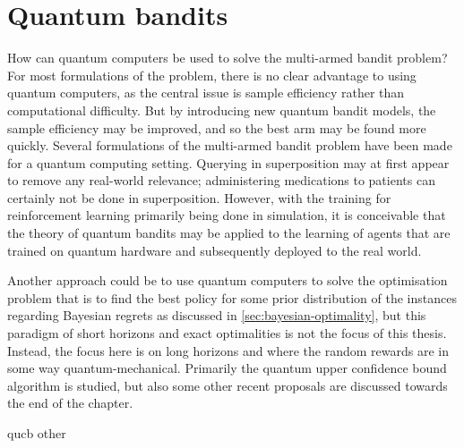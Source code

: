 \chapter{Quantum bandits}
\label{chap:qbandits}

How can quantum computers be used to solve the multi-armed bandit problem?
For most formulations of the problem, there is no clear advantage to using quantum computers, as the central issue is sample efficiency rather than computational difficulty.
But by introducing new quantum bandit models, the sample efficiency may be improved, and so the best arm may be found more quickly.
Several formulations of the multi-armed bandit problem have been made for a quantum computing setting.
Querying in superposition may at first appear to remove any real-world relevance; administering medications to patients can certainly not be done in superposition.
However, with the training for reinforcement learning primarily being done in simulation, it is conceivable that the theory of quantum bandits may be applied to the learning of agents that are trained on quantum hardware and subsequently deployed to the real world.

Another approach could be to use quantum computers to solve the optimisation problem that is to find the best policy for some prior distribution of the instances regarding Bayesian regrets as discussed in \cref{sec:bayesian-optimality}, but this paradigm of short horizons and exact optimalities is not the focus of this thesis.
Instead, the focus here is on long horizons and where the random rewards are in some way quantum-mechanical.
Primarily the quantum upper confidence bound algorithm is studied, but also some other recent proposals are discussed towards the end of the chapter.

{qucb}
{other}